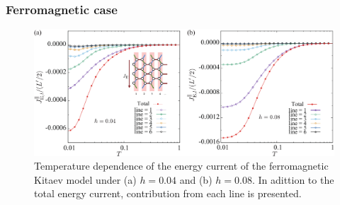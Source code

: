 \documentclass[reprint,amsmath,amssymb,aps,prx]{revtex4-2}
\begin{document}
   \subsubsection{Ferromagnetic case}
\begin{figure}
  \begin{center}
    \includegraphics[width=0.9\linewidth]{J_line_all.pdf}
  \end{center}
  \caption{Temperature dependence of the energy current of the ferromagnetic Kitaev model under (a) $h=0.04$ and (b) $h=0.08$. In adittion to the total energy current, contribution from each line is presented.}
  \label{fig:J_line}
\end{figure}
\end{document}
